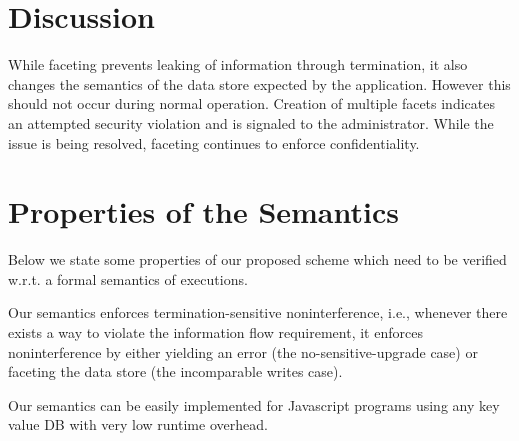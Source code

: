 \section{Discussion}

While faceting prevents leaking of information through termination, it 
also changes the semantics of the data store expected by the 
application.  However this should not occur during normal operation.  
Creation of multiple facets indicates an attempted security violation 
and is signaled to the administrator. While the issue is being 
resolved, faceting continues to enforce confidentiality.


\section{Properties of the Semantics}

Below we state some properties of our proposed scheme which need to be verified w.r.t.
a formal semantics of executions.

\begin{conj}
Our semantics enforces termination-sensitive noninterference, i.e., whenever there exists
a way to violate the information flow requirement, it enforces noninterference by either yielding an error (the no-sensitive-upgrade case)
or faceting the data store (the incomparable writes case).
\end{conj}

\begin{conj}
Our semantics can be easily implemented for Javascript programs using
any key value DB with very low runtime overhead.
\end{conj}

